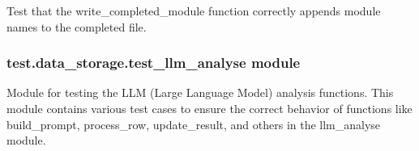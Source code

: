 \documentclass[letterpaper,10pt,english]{sphinxmanual}
\begin{document}

\begin{fulllineitems}
\label{\detokenize{test.data_storage:test.data_storage.test_data_storage_pipeline.test_write_completed_module}}
\pysigstartsignatures
\pysiglinewithargsret
{}
{\sphinxparamcomma {}}
{}
\pysigstopsignatures
\sphinxAtStartPar
Test that the write\_completed\_module function correctly appends module
names to the completed file.

\end{fulllineitems}



\subsubsection{test.data\_storage.test\_llm\_analyse module}
\label{\detokenize{test.data_storage:module-test.data_storage.test_llm_analyse}}\label{\detokenize{test.data_storage:test-data-storage-test-llm-analyse-module}}
\sphinxAtStartPar
Module for testing the LLM (Large Language Model) analysis functions.
This module contains various test cases to ensure the correct behavior of
functions like build\_prompt, process\_row, update\_result, and others in
the llm\_analyse module.
\end{document}
